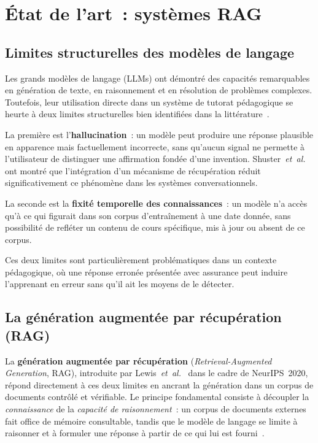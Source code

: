 \documentclass[11pt,a4paper]{article}
\begin{document}
\section{État de l'art~: systèmes RAG}
\label{sec:etat-art}

\subsection{Limites structurelles des modèles de langage}

Les grands modèles de langage (LLMs) ont démontré des capacités remarquables en génération de texte, en raisonnement et en résolution de problèmes complexes. Toutefois, leur utilisation directe dans un système de tutorat pédagogique se heurte à deux limites structurelles bien identifiées dans la littérature~\cite{gao2024ragsurvey,lewis2020rag}.

La première est l'\textbf{hallucination}~: un modèle peut produire une réponse plausible en apparence mais factuellement incorrecte, sans qu'aucun signal ne permette à l'utilisateur de distinguer une affirmation fondée d'une invention. Shuster~\textit{et~al.}~\cite{shuster2021hallucination} ont montré que l'intégration d'un mécanisme de récupération réduit significativement ce phénomène dans les systèmes conversationnels.

La seconde est la \textbf{fixité temporelle des connaissances}~: un modèle n'a accès qu'à ce qui figurait dans son corpus d'entraînement à une date donnée, sans possibilité de refléter un contenu de cours spécifique, mis à jour ou absent de ce corpus.

Ces deux limites sont particulièrement problématiques dans un contexte pédagogique, où une réponse erronée présentée avec assurance peut induire l'apprenant en erreur sans qu'il ait les moyens de le détecter.

\subsection{La génération augmentée par récupération (RAG)}

La \textbf{génération augmentée par récupération} (\textit{Retrieval-Augmented Generation}, RAG), introduite par Lewis~\textit{et~al.}~\cite{lewis2020rag} dans le cadre de NeurIPS~2020, répond directement à ces deux limites en ancrant la génération dans un corpus de documents contrôlé et vérifiable. Le principe fondamental consiste à découpler la \textit{connaissance} de la \textit{capacité de raisonnement}~: un corpus de documents externes fait office de mémoire consultable, tandis que le modèle de langage se limite à raisonner et à formuler une réponse à partir de ce qui lui est fourni~\cite{lewis2020rag}.
\end{document}
